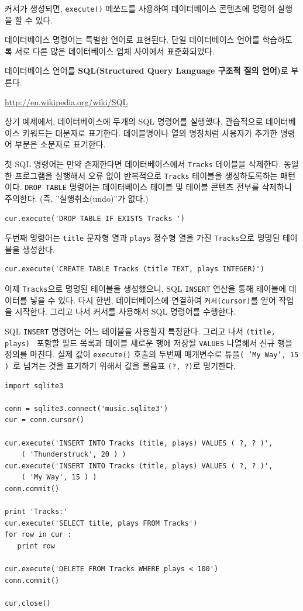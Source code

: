커서가 생성되면, {\tt execute()} 메쏘드를 사용하여 데이터베이스 콘텐츠에 명령어 실행을 할 수 있다.

데이터베이스 명령어는 특별한 언어로 표현된다.
단일 데이터베이스 언어를 학습하도록 서로 다른 많은 데이터베이스 업체 사이에서 표준화되었다.

데이터베이스 언어를 {\bf SQL(Structured Query Language 구조적 질의 언어)}로 부른다.

\url{http://en.wikipedia.org/wiki/SQL}

상기 예제에서, 데이터베이스에 두개의 SQL 명령어를 실행했다. 
관습적으로 데이터베이스 키워드는 대문자로 표기한다.
테이블명이나 열의 명칭처럼 사용자가 추가한 명령어 부분은 소문자로 표기한다.

첫 SQL 명령어는 만약 존재한다면 데이터베이스에서 {\tt Tracks} 테이블을 삭제한다.
동일한 프로그램을 실행해서 오류 없이 반복적으로 {\tt Tracks} 테이블을 생성하도록하는 패턴이다.
{\tt DROP TABLE} 명령어는 데이터베이스 테이블 및 테이블 콘텐츠 전부를 삭제하니 주의한다. (즉, ''실행취소(undo)''가 없다.)

\beforeverb
\begin{verbatim}
cur.execute('DROP TABLE IF EXISTS Tracks ')
\end{verbatim}
\afterverb
%

두번째 명령어는 {\tt title} 문자형 열과 {\tt plays} 정수형 열을 가진 {\tt Tracks}으로 명명된 테이블을 생성한다.

\beforeverb
\begin{verbatim}
cur.execute('CREATE TABLE Tracks (title TEXT, plays INTEGER)')
\end{verbatim}
\afterverb
%

이제 {\tt Tracks}으로 명명된 테이블을 생성했으니, SQL {\tt INSERT} 연산을 통해 테이블에 데이터를 넣을 수 있다.
다시 한번, 데이터베이스에 연결하여 {\tt 커서(cursor)}를 얻어 작업을 시작한다. 
그리고 나서 커서를 사용해서 SQL 명령어를 수행한다.

SQL {\tt INSERT} 명령어는 어느 테이블을 사용할지 특정한다.
그리고 나서 {\tt (title, plays) } 포함할 필드 목록과 테이블 새로운 행에 저장될 {\tt VALUES} 나열해서 신규 행을 정의를 마친다.
실제 값이 {\tt execute()} 호출의 두번째 매개변수로 튜플{\tt ( 'My Way', 15 ) }로 넘겨는 것을 표기하기 위해서 값을 물음표 {\tt (?, ?)}로 명기한다.

\beforeverb
\begin{verbatim}
import sqlite3

conn = sqlite3.connect('music.sqlite3')
cur = conn.cursor()

cur.execute('INSERT INTO Tracks (title, plays) VALUES ( ?, ? )', 
    ( 'Thunderstruck', 20 ) )
cur.execute('INSERT INTO Tracks (title, plays) VALUES ( ?, ? )', 
    ( 'My Way', 15 ) )
conn.commit()

print 'Tracks:'
cur.execute('SELECT title, plays FROM Tracks')
for row in cur :
   print row

cur.execute('DELETE FROM Tracks WHERE plays < 100')
conn.commit()

cur.close()
\end{verbatim}
\afterverb
%

